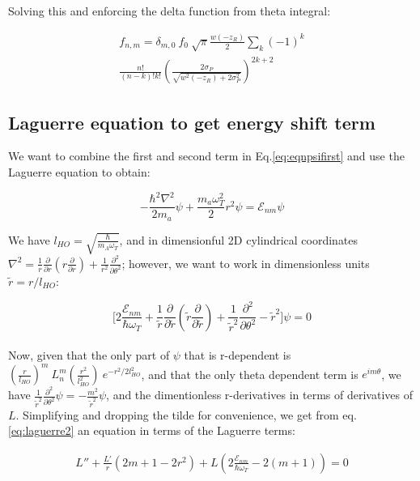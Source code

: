 \documentclass[a4paper,twocolumn,nobalancelastpage]{revtex4-1}
\newcommand{\lho}{l_{HO}}
\begin{document}
Solving this and enforcing the delta function from theta integral:

\begin{multline}
\label{eq:pumpterm}
f_{n,m}=\delta_{m,0} \ f_0  \ \sqrt{\pi}\frac{w(-z_{R})}{2} \sum_k (-1)^k  \\ \frac{n!}{(n-k)! k!} \left(\frac{2 \sigma_P}{\sqrt{w^2(-z_{R})+2\sigma_P^2}} \right)^{2k+2} 
\end{multline}

\subsection{Laguerre equation to get energy shift term}

We want to combine the first and second term in Eq.\ref{eq:eqnpsifirst} and use the Laguerre equation to obtain:

\begin{equation}
\label{eq:laguerre1}
-\frac{\hbar^2 \nabla^2}{2m_a} \psi+ \frac{m_a \omega_T^2}{2}r^2 \psi= \mathcal{E}_{nm} \psi
\end{equation}

We have $\lho=\sqrt{\frac{\hbar}{m_A \omega_T}}$, and in dimensionful 2D cylindrical coordinates $\nabla^2=\frac{1}{r} \frac{\partial}{\partial r}\left( r \frac{\partial }{\partial r} \right)+\frac{1}{r^2}\frac{\partial ^2}{\partial \theta^2} $; however, we want to work in dimensionless units $\tilde{r}=r/l_{HO}$:

\begin{equation}
\label{eq:laguerre2}
\bigg[ 2 \frac{\mathcal{E}_{nm}}{\hbar \omega_{T}}  + \frac{1}{\tilde{r}} \frac{\partial}{\partial \tilde{r}}\left( \tilde{r} \frac{\partial }{\partial \tilde{r}} \right)+\frac{1}{\tilde{r}^2}\frac{\partial ^2}{\partial \theta^2}  - \tilde{r}^2 \bigg]\psi =0
\end{equation}
\\
Now, given that the only part of $\psi$ that is r-dependent is $\left( \frac{r}{l_{HO}} \right)^m \ L^m_n\left(\frac{r^2}{l^2_{HO}} \right) \ e^{-r^2/2 l_{HO}^2}$, and that the only theta dependent term is $e^{im\theta}$, we have $\frac{1}{\tilde{r}^2}\frac{\partial ^2}{\partial \theta^2}\psi=-\frac{m^2}{\tilde{r}^2}\psi$, and the dimentionless r-derivatives in terms of derivatives of $L$. Simplifying and dropping the tilde for convenience, we get from eq. \eqref{eq:laguerre2} an equation in terms of the Laguerre terms:

\begin{align}
L'' + \frac{L'}{r} \left( 2m+1-2r^2 \right) + 
 L \left(2 \frac{\mathcal{E}_{nm}}{\hbar \omega_{T}} -2(m+1)\right) =0
\end{align}
\end{document}
